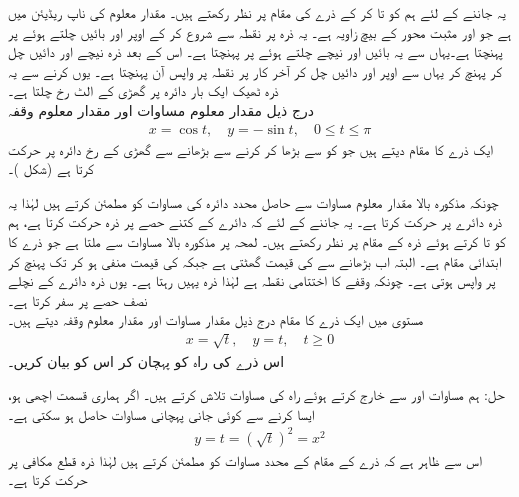 یہ جاننے کے لئے ہم  کو  تا  کر کے ذرے کی مقام پر نظر رکھتے ہیں۔ مقدار معلوم  کی ناپ ریڈیئن میں ہے  جو  اور مثبت  محور کے بیچ  زاویہ ہے۔ یہ ذرہ  پر نقطہ  سے شروع  کر کے اوپر اور بائیں چلتے ہوئے  پر   پہنچتا ہے۔یہاں سے یہ بائیں اور نیچے چلتے ہوئے  پر   پہنچتا ہے۔ اس کے بعد ذرہ نیچے اور دائیں چل کر  پہنچ کر یہاں سے اوپر اور دائیں چل کر آخر کار  پر نقطہ  پر واپس آن پہنچتا ہے۔ یوں  کرنے سے یہ ذرہ ٹھیک ایک بار دائرہ پر گھڑی کے الٹ رخ چلتا ہے۔
\\
درج ذیل مقدار معلوم مساوات اور مقدار معلوم وقفہ
\begin{align*}
x=\cos t,\quad y=-\sin t,\quad 0\le t\le \pi
\end{align*}
ایک ذرے کا مقام دیتے ہیں جو  کو  سے بڑھا کر  کرنے سے بڑھانے سے  گھڑی کے رخ دائرہ  پر حرکت کرتا ہے (شکل )۔

چونکہ مذکورہ بالا مقدار معلوم مساوات سے حاصل محدد دائرہ کی مساوات کو مطمئن کرتے ہیں لہٰذا یہ ذرہ دائرے پر حرکت کرتا ہے۔ یہ جاننے کے لئے کہ دائرے کے کتنے حصے پر ذرہ حرکت کرتا ہے، ہم  کو  تا  کرتے ہوئے ذرہ کے مقام پر نظر رکھتے ہیں۔ لمحہ  پر مذکورہ بالا مساوات سے  ملتا ہے جو ذرے کا ابتدائی مقام ہے۔ البتہ اب  بڑھانے سے  کی قیمت گھٹتی ہے جبکہ  کی قیمت منفی ہو کر  تک پہنچ کر  پر واپس  ہوتی ہے۔ چونکہ  وقفے کا اختتامی نقطہ ہے لہٰذا ذرہ یہیں رہتا ہے۔ یوں ذرہ دائرے کے نچلے نصف حصے پر سفر کرتا ہے۔ 
\\
مستوی  میں ایک ذرے کا مقام  درج ذیل مقدار مساوات اور مقدار معلوم وقفہ دیتے ہیں۔
\begin{align*}
x=\sqrt{t},\quad y=t,\quad t\ge 0
\end{align*}
اس ذرے کی راہ کو پہچان کر اس کو بیان کریں۔

حل:\quad
ہم مساوات  اور  سے  خارج کرتے ہوئے راہ کی مساوات تلاش کرتے ہیں۔ اگر ہماری قسمت اچھی ہو، ایسا کرنے سے کوئی جانی پہچانی مساوات حاصل ہو سکتی ہے۔
\begin{align*}
y=t=(\sqrt{t})^2=x^2
\end{align*}
اس سے ظاہر ہے کہ ذرے کے مقام کے محدد مساوات  کو مطمئن کرتے ہیں لہٰذا ذرہ قطع مکافی  پر حرکت کرتا ہے۔

